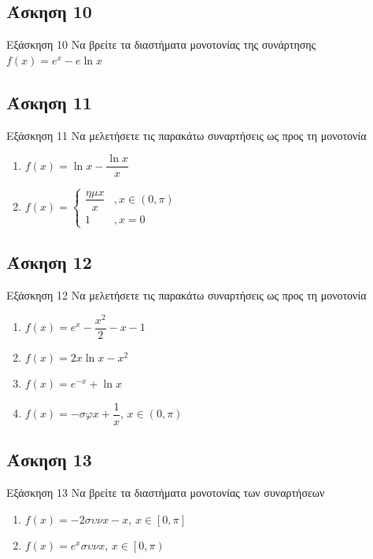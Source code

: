 \documentclass[greek]{beamer}
\begin{document}
\subsection{Άσκηση 10}
\begin{frame}[label=Άσκηση10]{Εξάσκηση 10}
 Να βρείτε τα διαστήματα μονοτονίας της συνάρτησης $f(x)=e^x-e\ln x$

\end{frame}

\subsection{Άσκηση 11}
\begin{frame}[label=Άσκηση11]{Εξάσκηση 11}
 Να μελετήσετε τις παρακάτω συναρτήσεις ως προς τη μονοτονία
 \begin{enumerate}
   \item<1-> $f(x)=\ln x-\dfrac{\ln x}{x}$
   \item<2-> $f(x)=\begin{cases}
     \dfrac{ημx}{x} &,x\in (0,\pi) \\
     1 &,x=0
   \end{cases}$
 \end{enumerate}

\end{frame}

\subsection{Άσκηση 12}
\begin{frame}[label=Άσκηση12]{Εξάσκηση 12}
 Να μελετήσετε τις παρακάτω συναρτήσεις ως προς τη μονοτονία
 \begin{enumerate}
   \item<1-> $f(x)=e^x-\dfrac{x^2}{2}-x-1$
   \item<2-> $f(x)=2x\ln x-x^2$
   \item<3-> $f(x)=e^{-x}+\ln x$
   \item<4-> $f(x)=-σφx+\dfrac{1}{x}$, $x\in (0,\pi)$
 \end{enumerate}

\end{frame}

\subsection{Άσκηση 13}
\begin{frame}[label=Άσκηση13]{Εξάσκηση 13}
  Να βρείτε τα διαστήματα μονοτονίας των συναρτήσεων
  \begin{enumerate}
    \item<1-> $f(x)=-2συνx-x$, $x\in [0,\pi]$
    \item<2-> $f(x)=e^xσυνx$, $x\in \left[ 0,\pi \right) $
  \end{enumerate}

\end{frame}
\end{document}
